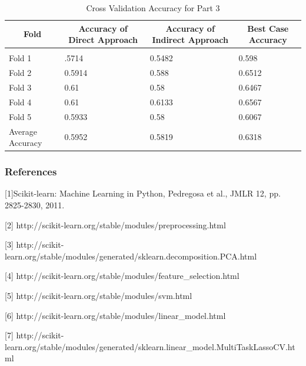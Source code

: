 \documentclass{article} %
\begin{document}
\begin{table}[h]
\caption{Cross Validation Accuracy for Part 3}
\label{classtable}
\begin{center}
	\begin{tabular}{llll}
		\multicolumn{1}{c}{\bf Fold}  &\multicolumn{1}{c}{\bf Accuracy of Direct Approach} &\multicolumn{1}{c}{\bf Accuracy of Indirect Approach} &\multicolumn{1}{c}{\bf Best Case Accuracy}
		\\ \hline \\
		Fold 1   &.5714 &0.5482 &0.598 \\
		Fold 2   &0.5914 &0.588 &0.6512 \\
		Fold 3   &0.61 &0.58 &0.6467 \\
		Fold 4   &0.61   &0.6133 &0.6567 \\
		Fold 5   &0.5933   &0.58 &0.6067 \\
		Average Accuracy   &0.5952 &0.5819 &0.6318\\
	\end{tabular}
\end{center}
\end{table} 

\subsubsection*{References}

\small{
[1]Scikit-learn: Machine Learning in Python, Pedregosa et al., JMLR 12, pp. 2825-2830, 2011.

[2] http://scikit-learn.org/stable/modules/preprocessing.html

[3] http://scikit-learn.org/stable/modules/generated/sklearn.decomposition.PCA.html

[4] http://scikit-learn.org/stable/modules/feature\_selection.html

[5] http://scikit-learn.org/stable/modules/svm.html

[6] http://scikit-learn.org/stable/modules/linear\_model.html

[7] http://scikit-learn.org/stable/modules/generated/sklearn.linear\_model.MultiTaskLassoCV.html

}
\end{document}
